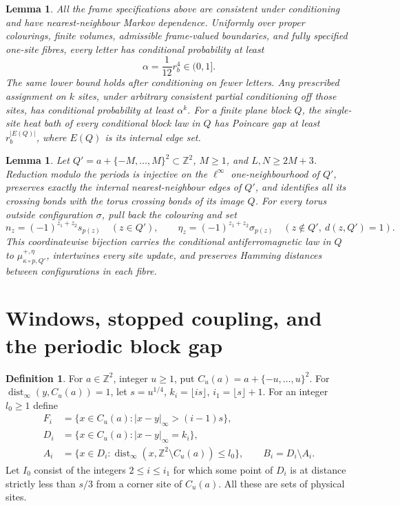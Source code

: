 \documentclass[11pt,reqno]{amsart}
\newtheorem{lemma}[theorem]{Lemma}
\theoremstyle{definition}
\newtheorem{definition}[theorem]{Definition}
\theoremstyle{remark}
\begin{document}
\begin{lemma}\label{l:planeenergy}
All the frame specifications above are consistent under conditioning
and have nearest-neighbour Markov dependence. Uniformly over proper
colourings, finite volumes, admissible frame-valued boundaries, and
fully specified one-site fibres, every letter has conditional
probability at least
\[
 \alpha=\frac1{12}r_b^4\in(0,1].
\]
The same lower bound holds after conditioning on fewer letters.
Any prescribed assignment on \(k\) sites, under arbitrary consistent
partial conditioning off those sites, has conditional probability
at least \(\alpha^k\).
For a finite plane block \(Q\), the single-site heat bath of every conditional block law in \(Q\) has Poincare gap at least
\(r_b^{|E(Q)|}\), where \(E(Q)\) is its internal edge set.
\end{lemma}

\begin{lemma}\label{l:boxlift}
Let \(Q'=a+\{-M,\ldots,M\}^2\subset\mathbb Z^2\), \(M\ge1\),
and \(L,N\ge2M+3\). Reduction modulo the periods is injective
on the \(\ell^\infty\) one-neighbourhood of \(Q'\), preserves exactly
the internal nearest-neighbour edges of \(Q'\), and identifies all its
crossing bonds with the torus crossing bonds of its image \(Q\).
For every torus outside configuration \(\sigma\), pull back the
colouring and set
\[
 n_z=(-1)^{z_1+z_2}s_{p(z)}\quad(z\in Q'),\qquad
 \eta_z=(-1)^{z_1+z_2}\sigma_{p(z)}
       \quad(z\notin Q',\ d(z,Q')=1).
\]
This coordinatewise bijection carries the conditional
antiferromagnetic law in \(Q\) to
\(\mu^{+,\eta}_{\kappa\circ p,Q'}\), intertwines every site update,
and preserves Hamming distances between configurations in each fibre.
\end{lemma}


\section{Windows, stopped coupling, and the periodic block gap}

\begin{definition}\label{d:shells}
For \(a\in\mathbb Z^2\), integer \(u\ge1\), put
\(C_u(a)=a+\{-u,\ldots,u\}^2\).
For \(\operatorname{dist}_\infty(y,C_u(a))=1\), let
\(s=u^{1/4}\), \(k_i=\lfloor is\rfloor\), \(i_1=\lfloor s\rfloor+1\).
For an integer \(l_0\ge1\) define
\[
 \begin{split}
 F_i&=\{x\in C_u(a):|x-y|_\infty>(i-1)s\},\\
 D_i&=\{x\in C_u(a):|x-y|_\infty=k_i\},\\
 A_i&=\{x\in D_i:\operatorname{dist}_\infty
                    (x,\mathbb Z^2\setminus C_u(a))\le l_0\},\qquad
 B_i=D_i\setminus A_i .
 \end{split}
\]
Let \(I_0\) consist of the integers \(2\le i\le i_1\) for which
some point of \(D_i\) is at distance strictly less than \(s/3\)
from a corner site of \(C_u(a)\).
All these are sets of physical sites.
\end{definition}
\end{document}
